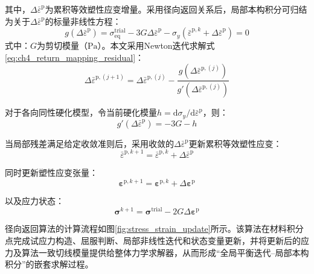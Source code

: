 其中，$\Delta\bar{\varepsilon}^{\mathrm{p}}$为累积等效塑性应变增量。采用径向返回关系后，局部本构积分可归结为关于$\Delta\bar{\varepsilon}^{\mathrm{p}}$的标量非线性方程：
\begin{equation}
	g\left(\Delta\bar{\varepsilon}^{\mathrm{p}}\right)
	=
	\sigma_{\mathrm{eq}}^{\mathrm{trial}}
	-
	3G\Delta\bar{\varepsilon}^{\mathrm{p}}
	-
	\sigma_y
	\left(
	\bar{\varepsilon}^{\mathrm p,k}
	+\Delta\bar{\varepsilon}^{\mathrm{p}}
	\right)
	=0
	\label{eq:ch4_return_mapping_residual}
\end{equation}
\noindent 式中：$G$为剪切模量（$\mathrm{Pa}$）。本文采用Newton迭代求解式\eqref{eq:ch4_return_mapping_residual}：
\begin{equation}
	\Delta\bar{\varepsilon}^{\mathrm p,(j+1)}
	=
	\Delta\bar{\varepsilon}^{\mathrm p,(j)}
	-
	\frac{
		g\!\left(
		\Delta\bar{\varepsilon}^{\mathrm p,(j)}
		\right)
	}{
		g'\!\left(
		\Delta\bar{\varepsilon}^{\mathrm p,(j)}
		\right)
	}
	\label{eq:ch4_return_newton}
\end{equation}

对于各向同性硬化模型，令当前硬化模量$h=\mathrm{d}\sigma_y/\mathrm{d}\bar{\varepsilon}^{\mathrm p}$，则：
\begin{equation}
	g'\left(\Delta\bar{\varepsilon}^{\mathrm{p}}\right)
	=
	-3G-h
	\label{eq:ch4_return_derivative}
\end{equation}

当局部残差满足给定收敛准则后，采用收敛的$\Delta\bar{\varepsilon}^{\mathrm{p}}$更新累积等效塑性应变：
\begin{equation}
	\bar{\varepsilon}^{\mathrm p,k+1}
	=
	\bar{\varepsilon}^{\mathrm p,k}
	+
	\Delta\bar{\varepsilon}^{\mathrm{p}}
	\label{eq:ch4_equivalent_plastic_strain_update}
\end{equation}

同时更新塑性应变张量：
\begin{equation}
	\boldsymbol{\varepsilon}^{\mathrm p,k+1}
	=
	\boldsymbol{\varepsilon}^{\mathrm p,k}
	+
	\Delta\boldsymbol{\varepsilon}^{\mathrm{p}}
	\label{eq:ch4_plastic_strain_update}
\end{equation}

以及应力状态：
\begin{equation}
	\boldsymbol{\sigma}^{k+1}
	=
	\boldsymbol{\sigma}^{\mathrm{trial}}
	-
	2G\Delta\boldsymbol{\varepsilon}^{\mathrm{p}}
	\label{eq:ch4_stress_update}
\end{equation}

径向返回算法的计算流程如图\ref{fig:stress_strain_update}所示。该算法在材料积分点完成试应力构造、屈服判断、局部非线性迭代和状态变量更新，并将更新后的应力及算法一致切线模量提供给整体力学求解器，从而形成“全局平衡迭代--局部本构积分”的嵌套求解过程。


